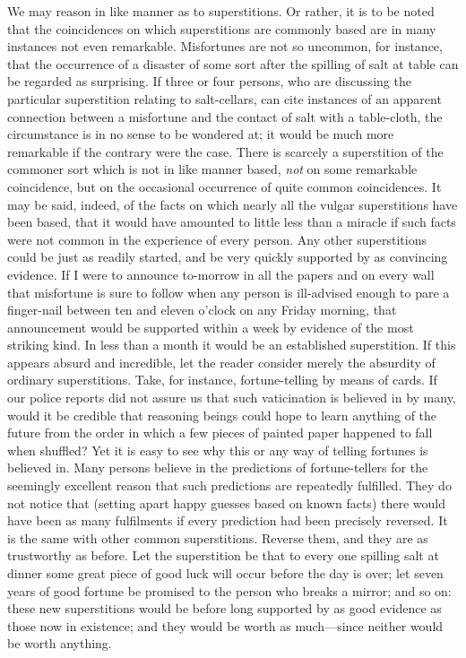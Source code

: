 \documentclass[letterpaper,12pt,oneside,openany]{memoir}
\begin{document}
We may reason in like manner as to superstitions.
Or rather, it is to be noted that the coincidences on
which superstitions are commonly based are in many
instances not even remarkable. Misfortunes are not so
uncommon, for instance, that the occurrence of a disaster
of some sort after the spilling of salt at table can
be regarded as surprising. If three or four persons,
who are discussing the particular superstition relating
to salt-cellars, can cite instances of an apparent connection
between a misfortune and the contact of salt
with a table-cloth, the circumstance is in no sense to
be wondered at; it would be much more remarkable
if the contrary were the case. There is scarcely a
superstition of the commoner sort which is not in like
manner based, \textit{not} on some remarkable coincidence,
but on the occasional occurrence of quite common
coincidences. It may be said, indeed, of the facts on
which nearly all the vulgar superstitions have been
based, that it would have amounted to little less than
a miracle if such facts were not common in the
experience of every person. Any other superstitions
could be just as readily started, and be very quickly
supported by as convincing evidence. If I were to
announce to-morrow in all the papers and on every
wall that misfortune is sure to follow when any person
is ill-advised enough to pare a finger-nail between ten
and eleven o'clock on any Friday morning, that announcement
would be supported within a week by
evidence of the most striking kind. In less than a
month it would be an established superstition. If this
appears absurd and incredible, let the reader consider
merely the absurdity of ordinary superstitions. Take,
for instance, fortune-telling by means of cards. If our
police reports did not assure us that such vaticination is
believed in by many, would it be credible that reasoning
beings could hope to learn anything of the future from
the order in which a few pieces of painted paper
happened to fall when shuffled? Yet it is easy to see
why this or any way of telling fortunes is believed in.
Many persons believe in the predictions of fortune-tellers
for the seemingly excellent reason that such predictions
are repeatedly fulfilled. They do not notice that
(setting apart happy guesses based on known facts)
there would have been as many fulfilments if every prediction
had been precisely reversed. It is the same with
other common superstitions. Reverse them, and they
are as trustworthy as before. Let the superstition be
that to every one spilling salt at dinner some great
piece of good luck will occur before the day is over;
let seven years of good fortune be promised to the
person who breaks a mirror; and so on: these new
superstitions would be before long supported by as
good evidence as those now in existence; and they
would be worth as much---since neither would be
worth anything.
\end{document}
